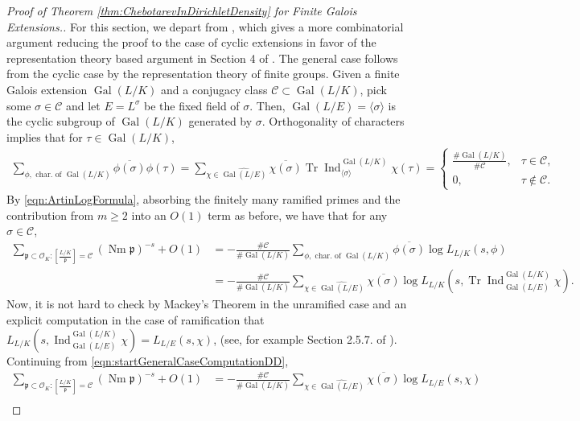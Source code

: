 \documentclass[12pt]{amsart}
\theoremstyle{definition}
\theoremstyle{remark}
\numberwithin{equation}{section}
\newcommand{\cC}{\mathcal C}
\newcommand{\cO}{\mathcal O}
\newcommand{\fkp}{\mathfrak p}
\DeclareMathOperator{\norm}{Nm}
\DeclareMathOperator{\trace}{Tr}
\DeclareMathOperator{\Ind}{Ind}
\newcommand{\artin}[2]{\left[ \frac{#1}{#2}\right]}
\DeclareMathOperator{\Gal}{Gal}
\begin{document}
\begin{proof}[Proof of Theorem \ref{thm:ChebotarevInDirichletDensity} for Finite Galois Extensions.] 
For this section, we depart from \cite{FriedJarden08}, which gives a more combinatorial argument reducing the proof to the case of cyclic extensions in favor of the representation theory based argument in Section 4 of \cite{LagariasOdlyzko77}. The general case follows from the cyclic case by the representation theory of finite groups. Given a finite Galois extension $\Gal(L/K)$ and a conjugacy class $\cC \subset \Gal(L/K)$, pick some $\sigma \in \cC$ and let $E = L^{\sigma}$ be the fixed field of $\sigma$. Then, $\Gal(L/E) = \langle \sigma \rangle$ is the cyclic subgroup of $\Gal(L/K)$ generated by $\sigma$. Orthogonality of characters implies that for $\tau \in \Gal(L/K)$, 
\begin{align}
 \sum_{\phi, \text{ char. of } \Gal(L/K)} \overline{\phi(\sigma)} \phi(\tau) = \sum_{\chi \in \widehat{\Gal(L/E)}} \overline{\chi(\sigma)} \trace \Ind_{\langle \sigma \rangle}^{\Gal(L/K)}\chi(\tau) = \begin{cases}\frac{\# \Gal(L/K)}{\# \cC}, & \tau \in \cC, \\ 0, & \tau \notin \cC. \end{cases} 
\end{align}
By \eqref{eqn:ArtinLogFormula}, absorbing the finitely many ramified primes and the contribution from $m \geq 2$ into an $O(1)$ term as before, we have that for any $\sigma \in \cC$, 
\begin{align} \label{eqn:startGeneralCaseComputationDD}
\sum_{\fkp \subset \cO_{K}: \artin{L/K}{\fkp} = \cC} (\norm \fkp)^{-s} + O(1) & = -\frac{\# \cC}{\# \Gal(L/K)} \sum_{\phi, \text{ char. of } \Gal(L/K)} \overline{\phi(\sigma)} \log L_{L/K}(s, \phi) \nonumber \\
&  = -\frac{\# \cC}{\# \Gal(L/K)} \sum_{\chi \in \widehat{\Gal(L/E)}} \overline{\chi(\sigma)} \log L_{L/K}(s, \trace \Ind_{\Gal(L/E)}^{\Gal(L/K)}\chi). 
\end{align}
Now, it is not hard to check by Mackey's Theorem in the unramified case and an explicit computation in the case of ramification that $L_{L/K}(s, \Ind_{\Gal(L/E)}^{\Gal(L/K)}\chi) = L_{L/E}(s, \chi)$, (see, for example Section 2.5.7. of \cite{Snyder02}). Continuing from \eqref{eqn:startGeneralCaseComputationDD},
\begin{align}
\sum_{\fkp \subset \cO_{K}: \artin{L/K}{\fkp} = \cC} (\norm \fkp)^{-s} + O(1) & = -\frac{\# \cC}{\# \Gal(L/K)} \sum_{\chi \in \widehat{\Gal(L/E)}} \overline{\chi(\sigma)} \log L_{L/E}(s, \chi) \nonumber \\

\end{align}
\end{proof}
\end{document}
